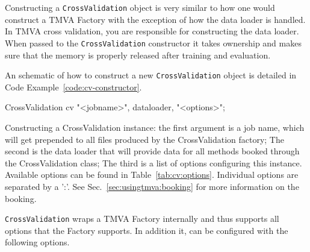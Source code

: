 Constructing a \texttt{CrossValidation} object is very similar to how one would construct a TMVA Factory with the exception of how the data loader is handled. In TMVA cross validation, you are responsible for constructing the data loader. When passed to the \texttt{CrossValidation} constructor it takes ownership and makes sure that the memory is properly released after training and evaluation.

An schematic of how to construct a new \texttt{CrossValidation} object is detailed in Code Example~\ref{code:cv-constructor}.

\begin{codeexample}
\begin{tmvacode}
CrossValidation cv {"<jobname>", dataloader, "<options>"};
\end{tmvacode}
\caption[.]{\codeexampleCaptionSize Constructing a CrossValidation instance:
   the first argument is a job name, which will get prepended to all files
   produced by the CrossValidation factory; The second is the data loader that
   will provide data for all methods booked through the CrossValidation class;
   The third is a list of options configuring this instance. Available options
   can be found in Table~\ref{tab:cv:options}.
   Individual options are separated by a ':'. See
   Sec.~\ref{sec:usingtmva:booking} for more information on the booking.}
\label{code:cv-constructor}
\end{codeexample}

\texttt{CrossValidation} wraps a TMVA Factory internally and thus supports all options that the Factory supports. In addition it, can be configured with the following options.

